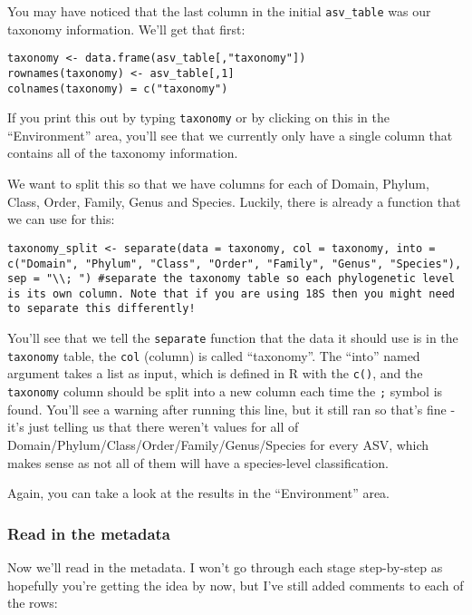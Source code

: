 \documentclass[
]{book}
\begin{document}
You may have noticed that the last column in the initial \texttt{asv\_table} was our taxonomy information. We'll get that first:

\begin{verbatim}
taxonomy <- data.frame(asv_table[,"taxonomy"])
rownames(taxonomy) <- asv_table[,1]
colnames(taxonomy) = c("taxonomy")
\end{verbatim}

If you print this out by typing \texttt{taxonomy} or by clicking on this in the ``Environment'' area, you'll see that we currently only have a single column that contains all of the taxonomy information.

We want to split this so that we have columns for each of Domain, Phylum, Class, Order, Family, Genus and Species. Luckily, there is already a function that we can use for this:

\begin{verbatim}
taxonomy_split <- separate(data = taxonomy, col = taxonomy, into = c("Domain", "Phylum", "Class", "Order", "Family", "Genus", "Species"), sep = "\\; ") #separate the taxonomy table so each phylogenetic level is its own column. Note that if you are using 18S then you might need to separate this differently!
\end{verbatim}

You'll see that we tell the \texttt{separate} function that the data it should use is in the \texttt{taxonomy} table, the \texttt{col} (column) is called ``taxonomy''. The ``into'' named argument takes a list as input, which is defined in R with the \texttt{c()}, and the \texttt{taxonomy} column should be split into a new column each time the \texttt{;} symbol is found. You'll see a warning after running this line, but it still ran so that's fine - it's just telling us that there weren't values for all of Domain/Phylum/Class/Order/Family/Genus/Species for every ASV, which makes sense as not all of them will have a species-level classification.

Again, you can take a look at the results in the ``Environment'' area.

\subsubsection{Read in the metadata}\label{read-in-the-metadata-1}

Now we'll read in the metadata. I won't go through each stage step-by-step as hopefully you're getting the idea by now, but I've still added comments to each of the rows:
\end{document}
